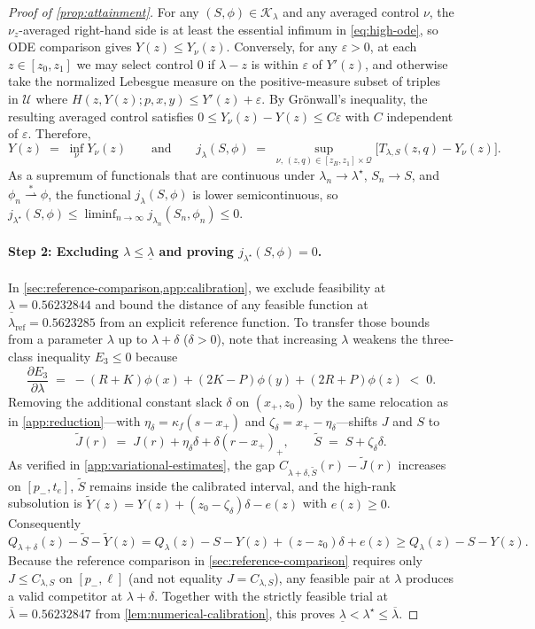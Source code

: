 \documentclass[11pt]{article}
\numberwithin{equation}{section}
\theoremstyle{plain}
\theoremstyle{definition}
\newcommand{\1}{\mathbf{1}}
\newcommand{\calK}{\mathcal{K}}
\newcommand{\calQ}{\mathcal{Q}}
\newcommand{\calU}{\mathcal{U}}
\begin{document}
\begin{proof}[Proof of {\cref{prop:attainment}}]
For any $(S, \phi) \in \calK_\lambda$ and any averaged control $\nu$, the $\nu_z$-averaged right-hand side is at least the essential infimum in \cref{eq:high-ode}, so ODE comparison gives $Y(z) \le Y_\nu(z)$. Conversely, for any $\varepsilon > 0$, at each $z \in [z_0, z_1]$ we may select control $0$ if $\lambda - z$ is within $\varepsilon$ of $Y'(z)$, and otherwise take the normalized Lebesgue measure on the positive-measure subset of triples in $\calU$ where $H(z, Y(z); p, x, y) \le Y'(z) + \varepsilon$. By Gr\"onwall's inequality, the resulting averaged control satisfies $0 \le Y_\nu(z) - Y(z) \le C\varepsilon$ with $C$ independent of $\varepsilon$. Therefore,
\[
  Y(z) \;=\; \inf_\nu Y_\nu(z)
  \qquad\text{and}\qquad
  j_\lambda(S, \phi) \;=\; \sup_{\nu,\, (z, q) \in [z_B, z_1] \times \calQ}\bigl[T_{\lambda, S}(z, q) - Y_\nu(z)\bigr].
\]
As a supremum of functionals that are continuous under $\lambda_n \to \lambda^\star$, $S_n \to S$, and $\phi_n \stackrel{*}{\rightharpoonup} \phi$, the functional $j_\lambda(S, \phi)$ is lower semicontinuous, so $j_{\lambda^\star}(S, \phi) \le \liminf_{n \to \infty} j_{\lambda_n}(S_n, \phi_n) \le 0$.

\paragraph{Step 2: Excluding $\lambda \le \underline{\lambda}$ and proving $j_{\lambda^\star}(S, \phi) = 0$.}
In \cref{sec:reference-comparison,app:calibration}, we exclude feasibility at $\underline{\lambda} = 0.56232844$ and bound the distance of any feasible function at $\lambda_{\mathrm{ref}} = 0.5623285$ from an explicit reference function. To transfer those bounds from a parameter $\lambda$ up to $\lambda + \delta$ ($\delta > 0$), note that increasing $\lambda$ weakens the three-class inequality $E_3 \le 0$ because
\[
  \frac{\partial E_3}{\partial \lambda}
  \;=\; -(R + K)\phi(x) + (2K - P)\phi(y) + (2R + P)\phi(z) \;<\; 0.
\]
Removing the additional constant slack $\delta$ on $(x_+, z_0)$ by the same relocation as in \cref{app:reduction}---with $\eta_\delta = \kappa_f(s - x_+)$ and $\zeta_\delta = x_+ - \eta_\delta$---shifts $J$ and $S$ to
\[
  \widetilde{J}(r) \;=\; J(r) + \eta_\delta\delta + \delta(r - x_+)_+,
  \qquad
  \widetilde{S} \;=\; S + \zeta_\delta\delta.
\]
As verified in \cref{app:variational-estimates}, the gap $C_{\lambda+\delta, \widetilde{S}}(r) - \widetilde{J}(r)$ increases on $[p_-, t_e]$, $\widetilde{S}$ remains inside the calibrated interval, and the high-rank subsolution is $\widetilde Y(z)=Y(z)+(z_0-\zeta_\delta)\delta-e(z)$ with $e(z)\ge0$. Consequently
\[
 Q_{\lambda+\delta}(z)-\widetilde S-\widetilde Y(z)
 =Q_\lambda(z)-S-Y(z)+(z-z_0)\delta+e(z)
 \ge Q_\lambda(z)-S-Y(z).
\] Because the reference comparison in \cref{sec:reference-comparison} requires only $J \le C_{\lambda, S}$ on $[p_-, \ell]$ (and not equality $J = C_{\lambda, S}$), any feasible pair at $\lambda$ produces a valid competitor at $\lambda + \delta$. Together with the strictly feasible trial at $\overline{\lambda} = 0.56232847$ from \cref{lem:numerical-calibration}, this proves $\underline{\lambda} < \lambda^\star \le \overline{\lambda}$.


\end{proof}
\end{document}
